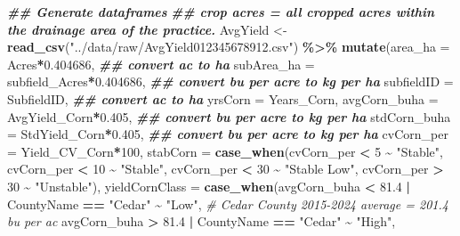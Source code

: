\documentclass[
]{article}
\newenvironment{Shaded}{\begin{snugshade}}{\end{snugshade}}
\newcommand{\AttributeTok}[1]{\textcolor[rgb]{0.13,0.29,0.53}{#1}}
\newcommand{\CommentTok}[1]{\textcolor[rgb]{0.56,0.35,0.01}{\textit{#1}}}
\newcommand{\DecValTok}[1]{\textcolor[rgb]{0.00,0.00,0.81}{#1}}
\newcommand{\DocumentationTok}[1]{\textcolor[rgb]{0.56,0.35,0.01}{\textbf{\textit{#1}}}}
\newcommand{\FloatTok}[1]{\textcolor[rgb]{0.00,0.00,0.81}{#1}}
\newcommand{\FunctionTok}[1]{\textcolor[rgb]{0.13,0.29,0.53}{\textbf{#1}}}
\newcommand{\NormalTok}[1]{#1}
\newcommand{\OtherTok}[1]{\textcolor[rgb]{0.56,0.35,0.01}{#1}}
\newcommand{\SpecialCharTok}[1]{\textcolor[rgb]{0.81,0.36,0.00}{\textbf{#1}}}
\newcommand{\StringTok}[1]{\textcolor[rgb]{0.31,0.60,0.02}{#1}}
\begin{document}
\begin{Shaded}
\begin{Highlighting}[]
\DocumentationTok{\#\# Generate dataframes}
\DocumentationTok{\#\# crop acres = all cropped acres within the drainage area of the practice.}
\NormalTok{AvgYield }\OtherTok{\textless{}{-}} \FunctionTok{read\_csv}\NormalTok{(}\StringTok{"../data/raw/AvgYield012345678912.csv"}\NormalTok{) }\SpecialCharTok{\%\textgreater{}\%}
  \FunctionTok{mutate}\NormalTok{(}\AttributeTok{area\_ha =}\NormalTok{ Acres}\SpecialCharTok{*}\FloatTok{0.404686}\NormalTok{, }\DocumentationTok{\#\# convert ac to ha}
         \AttributeTok{subArea\_ha =}\NormalTok{ subfield\_Acres}\SpecialCharTok{*}\FloatTok{0.404686}\NormalTok{, }\DocumentationTok{\#\# convert bu per acre to kg per ha}
         \AttributeTok{subfieldID =}\NormalTok{ SubfieldID, }\DocumentationTok{\#\# convert ac to ha}
         \AttributeTok{yrsCorn =}\NormalTok{ Years\_Corn,}
         \AttributeTok{avgCorn\_buha =}\NormalTok{ AvgYield\_Corn}\SpecialCharTok{*}\FloatTok{0.405}\NormalTok{, }\DocumentationTok{\#\# convert bu per acre to kg per ha}
         \AttributeTok{stdCorn\_buha =}\NormalTok{ StdYield\_Corn}\SpecialCharTok{*}\FloatTok{0.405}\NormalTok{, }\DocumentationTok{\#\# convert bu per acre to kg per ha}
         \AttributeTok{cvCorn\_per =}\NormalTok{ Yield\_CV\_Corn}\SpecialCharTok{*}\DecValTok{100}\NormalTok{,}
         \AttributeTok{stabCorn =} \FunctionTok{case\_when}\NormalTok{(cvCorn\_per }\SpecialCharTok{\textless{}} \DecValTok{5} \SpecialCharTok{\textasciitilde{}} \StringTok{"Stable"}\NormalTok{,}
\NormalTok{                              cvCorn\_per }\SpecialCharTok{\textless{}} \DecValTok{10} \SpecialCharTok{\textasciitilde{}} \StringTok{"Stable"}\NormalTok{,}
\NormalTok{                              cvCorn\_per }\SpecialCharTok{\textless{}} \DecValTok{30} \SpecialCharTok{\textasciitilde{}} \StringTok{"Stable Low"}\NormalTok{,}
\NormalTok{                              cvCorn\_per }\SpecialCharTok{\textgreater{}} \DecValTok{30}  \SpecialCharTok{\textasciitilde{}} \StringTok{"Unstable"}\NormalTok{),}
         \AttributeTok{yieldCornClass =} \FunctionTok{case\_when}\NormalTok{(avgCorn\_buha }\SpecialCharTok{\textless{}} \FloatTok{81.4} \SpecialCharTok{|}\NormalTok{ CountyName }\SpecialCharTok{==} \StringTok{"Cedar"} \SpecialCharTok{\textasciitilde{}} \StringTok{"Low"}\NormalTok{, }\CommentTok{\# Cedar County 2015{-}2024 average = 201.4 bu per ac}
\NormalTok{                                    avgCorn\_buha }\SpecialCharTok{\textgreater{}} \FloatTok{81.4} \SpecialCharTok{|}\NormalTok{ CountyName }\SpecialCharTok{==} \StringTok{"Cedar"} \SpecialCharTok{\textasciitilde{}} \StringTok{"High"}\NormalTok{,}

\end{Highlighting}
\end{Shaded}
\end{document}
